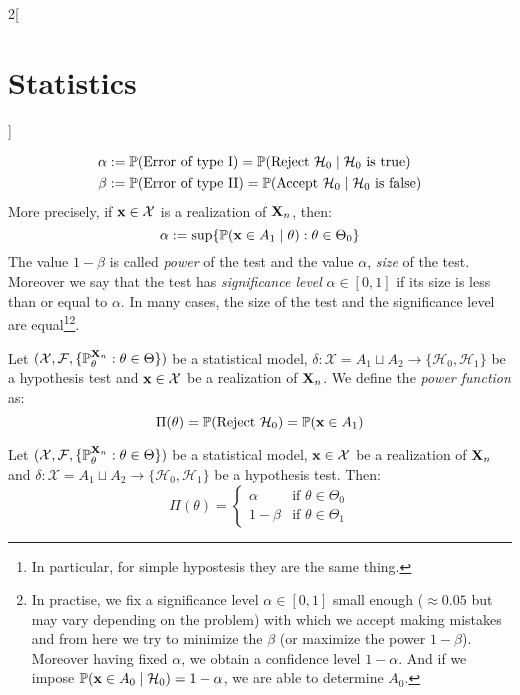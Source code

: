 \documentclass[../../../main.tex]{subfiles}
\begin{document}
\begin{multicols}{2}[\section{Statistics}]
\begin{definition}
    \begin{align*}
      \alpha & :=\mathbb{P}(\text{Error of type I})=\mathbb{P}(\text{Reject $\mathcal{H}_0$}\mid\text{$\mathcal{H}_0$ is true})   \\
      \beta  & :=\mathbb{P}(\text{Error of type II})=\mathbb{P}(\text{Accept $\mathcal{H}_0$}\mid\text{$\mathcal{H}_0$ is false})
    \end{align*}
    More precisely, if $\boldsymbol{\mathrm{x}}\in\mathcal{X}$ is a realization of $\boldsymbol{\mathrm{X}}_n$, then: $$\alpha:=\sup\{\mathbb{P}(\boldsymbol{\mathrm{x}}\in A_1\mid \theta):\theta\in\Theta_0\}$$
    The value $1-\beta$ is called \emph{power} of the test and the value $\alpha$, \emph{size} of the test. Moreover we say that the test has \emph{significance level} $\alpha\in[0,1]$ if its size is less than or equal to $\alpha$. In many cases, the size of the test and the significance level are equal\footnote{In particular, for simple hypostesis they are the same thing.}\footnote{In practise, we fix a significance level $\alpha\in[0,1]$ small enough ($\approx 0.05$ but may vary depending on the problem) with which we accept making mistakes and from here we try to minimize the $\beta$ (or maximize the power $1-\beta$). Moreover having fixed $\alpha$, we obtain a confidence level $1-\alpha$. And if we impose $\mathbb{P}(\boldsymbol{\mathrm{x}}\in A_0\mid \mathcal{H}_0)=1-\alpha$, we are able to determine $A_0$.}.
  \end{definition}
  \begin{definition}
    Let $(\mathcal{X},\mathcal{F},\{\mathbb{P}_\theta^{\boldsymbol{\mathrm{X}}_n}:\theta\in\Theta\})$ be a statistical model, $\delta:\mathcal{X}=A_1\sqcup A_2\rightarrow\{\mathcal{H}_0,\mathcal{H}_1\}$ be a hypothesis test and $\boldsymbol{\mathrm{x}}\in\mathcal{X}$ be a realization of $\boldsymbol{\mathrm{X}}_n$. We define the \emph{power function} as: $$\Pi(\theta)=\mathbb{P}(\text{Reject $\mathcal{H}_0$})=\mathbb{P}(\boldsymbol{\mathrm{x}}\in A_1)$$
  \end{definition}
  \begin{proposition}
    Let $(\mathcal{X},\mathcal{F},\{\mathbb{P}_\theta^{\boldsymbol{\mathrm{X}}_n}:\theta\in\Theta\})$ be a statistical model, $\boldsymbol{\mathrm{x}}\in\mathcal{X}$ be a realization of $\boldsymbol{\mathrm{X}}_n$ and $\delta:\mathcal{X}=A_1\sqcup A_2\rightarrow\{\mathcal{H}_0,\mathcal{H}_1\}$ be a hypothesis test. Then:
    $$
      \Pi(\theta)=
      \begin{cases}
        \alpha  & \text{if }\theta\in\Theta_0 \\
        1-\beta & \text{if }\theta\in\Theta_1
      \end{cases}
    $$
  \end{proposition}

\end{multicols}
\end{document}
